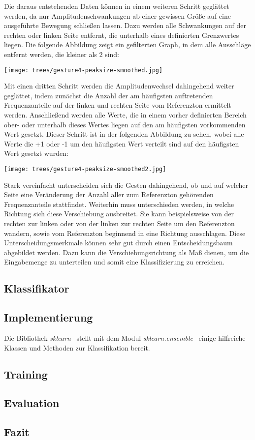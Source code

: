Die daraus entstehenden Daten können in einem weiteren Schritt geglättet werden, da nur Amplitudenschwankungen ab einer gewissen 
Größe auf eine ausgeführte Bewegung schließen lassen. Dazu werden alle Schwankungen auf der rechten oder linken Seite entfernt, 
die unterhalb eines definierten Grenzwertes liegen. 
Die folgende Abbildung zeigt ein gefilterten Graph, in dem alle Ausschläge entfernt werden, die kleiner als 2 sind:

\begin{center}
  \texttt{[image: trees/gesture4-peaksize-smoothed.jpg]}
\end{center}

Mit einen dritten Schritt werden die Amplitudenwechsel dahingehend weiter geglättet, indem zunächst die Anzahl der am häufigsten 
auftretenden Frequenzanteile auf der linken und rechten Seite vom Referenzton ermittelt werden. Anschließend werden alle Werte,
die in einem vorher definierten Bereich ober- oder unterhalb dieses Wertes liegen auf den am häufigsten vorkommenden Wert gesetzt.
Dieser Schritt ist in der folgenden Abbildung zu sehen, wobei alle Werte die +1 oder -1 um den häufigsten Wert verteilt sind 
auf den häufigsten Wert gesetzt wurden:

\begin{center}
  \texttt{[image: trees/gesture4-peaksize-smoothed2.jpg]}
\end{center}


Stark vereinfacht unterscheiden sich die Gesten dahingehend, ob und auf welcher Seite 
eine Veränderung der Anzahl aller zum Referenzton gehörenden Frequenzanteile stattfindet. 
Weiterhin muss unterschieden werden, in welche Richtung sich diese Verschiebung ausbreitet. 
Sie kann beispielsweise von der rechten zur linken oder von der linken zur rechten Seite 
um den Referenzton wandern, sowie vom Referenzton beginnend in eine Richtung ausschlagen. 
Diese Unterscheidungsmerkmale können sehr gut durch einen Entscheidungsbaum abgebildet werden. 
Dazu kann die Verschiebungsrichtung als Maß dienen, um die Eingabemenge zu unterteilen und 
somit eine Klassifizierung zu erreichen.


\subsection{Klassifikator}

\subsection{Implementierung}
Die Bibliothek \textit{sklearn}~\cite{sklearn} stellt mit dem Modul \textit{sklearn.ensemble}~\cite{sklearn.ensemble} einige hilfreiche Klassen und Methoden zur Klassifikation bereit.

\subsection{Training}

\subsection{Evaluation}

\subsection{Fazit}


